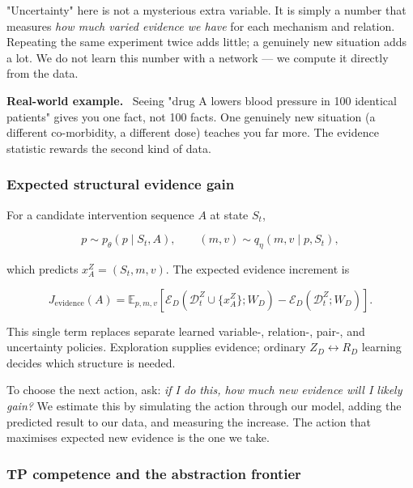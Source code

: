 \documentclass[11pt]{article}
\newenvironment{plainword}{%
  \par\medskip\noindent\begin{minipage}{\textwidth}%
  \color{gray!75!black}\small\itshape
}{%
  \end{minipage}\par\medskip}
\newenvironment{example}{%
  \par\smallskip\noindent\begin{minipage}{\textwidth}%
  \color{teal!60!black}\small
  \textbf{\color{teal!70!black}Real-world example.}\
}{%
  \end{minipage}\par\smallskip}
\begin{document}
\begin{plainword}
"Uncertainty" here is not a mysterious extra variable. It is simply a number that measures \emph{how much varied evidence we have}
for each mechanism and relation. Repeating the same experiment twice adds little; a genuinely new situation adds a lot. We do not
learn this number with a network --- we compute it directly from the data.
\end{plainword}

\begin{example}
Seeing "drug A lowers blood pressure in 100 identical patients" gives you one fact, not 100 facts. One genuinely new situation (a
different co-morbidity, a different dose) teaches you far more. The evidence statistic rewards the second kind of data.
\end{example}

\subsubsection*{Expected structural evidence gain}

For a candidate intervention sequence $A$ at state $S_t$,

\[
p\sim p_\theta(p\mid S_t,A),
\qquad
(m,v)\sim q_\eta(m,v\mid p,S_t),
\]

which predicts $x_A^Z=(S_t,m,v)$. The expected evidence increment is

\[
\boxed{
J_{\mathrm{evidence}}(A)=
\mathbb E_{p,m,v}
\left[
\mathcal E_D(\mathcal D_t^Z\cup\{x_A^Z\};W_D)
-\mathcal E_D(\mathcal D_t^Z;W_D)
\right].}
\]

This single term replaces separate learned variable-, relation-, pair-, and uncertainty policies. Exploration supplies evidence;
ordinary $Z_D\leftrightarrow R_D$ learning decides which structure is needed.

\begin{plainword}
To choose the next action, ask: \emph{if I do this, how much new evidence will I likely gain?} We estimate this by simulating the
action through our model, adding the predicted result to our data, and measuring the increase. The action that maximises expected
new evidence is the one we take.
\end{plainword}

\subsubsection*{TP competence and the abstraction frontier}
\end{document}

